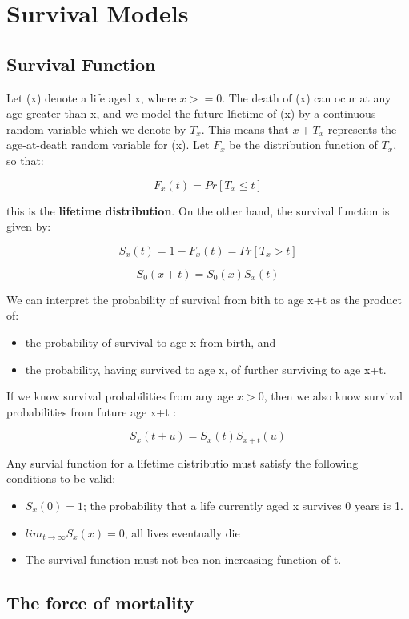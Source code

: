 \chapter{Survival Models}

\section{Survival Function}

Let (x) denote a life aged x, where $x>= 0$. The death of (x) can ocur at any age greater than x, and we model the future lfietime of (x) by a continuous random variable which we denote by $T_x$. This means that $x+T_x$ represents the age-at-death random variable for (x). Let $F_x$ be the distribution function of $T_x$, so that:

$$F_x(t) = Pr[T_x \leq t]$$

this is the \textbf{lifetime distribution}. On the other hand, the survival function is given by:

$$S_x(t) = 1 - F_x(t) = Pr[T_x>t]$$


$$S_0(x+t) = S_0(x)S_x(t)$$

We can interpret the probability of survival from bith to age x+t as the product of:

\begin{itemize}
    \item the probability of survival to age x from birth, and
    \item the probability, having survived to age x, of further surviving to age x+t.
\end{itemize}

If we know survival probabilities from any age $x > 0$, then we also know survival probabilities from future age x+t :

$$S_x(t+u) = S_x(t)S_{x+t}(u)$$

Any survial function for a lifetime distributio must satisfy the following conditions to be valid:

\begin{itemize}
    \item $S_x(0) = 1$; the probability that a life currently aged x survives 0 years is 1. 
    \item $lim_{t\rightarrow\infty}S_x(x) = 0$, all lives eventually die
    \item The survival function must not bea  non increasing function of t.
\end{itemize}

\section{The force of mortality}


